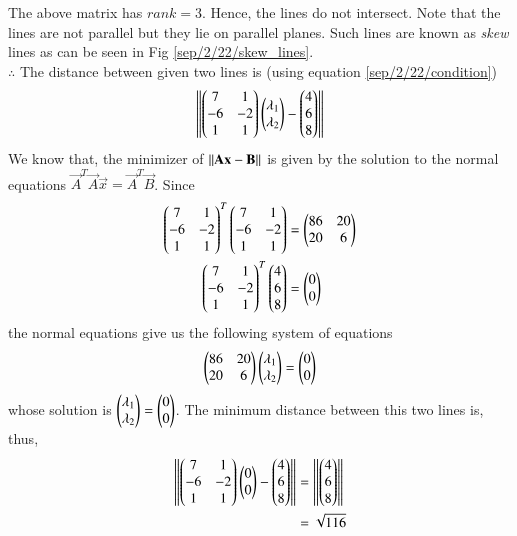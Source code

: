 The above matrix has $rank = 3$.  Hence, the lines do not intersect.  Note that the lines are not parallel but they  lie on parallel planes.  Such lines are known as {\em skew} lines as can be seen in Fig \ref{sep/2/22/skew_lines}.\\
$\therefore$ The distance between given two lines is (using  equation \eqref{sep/2/22/condition})
\begin{align}
\left\lVert\begin{pmatrix}7 & 1 \\ -6 & -2 \\ 1 & 1\end{pmatrix}\begin{pmatrix}\lambda_1\\ \lambda_2\end{pmatrix} - \begin{pmatrix}4\\6\\8\end{pmatrix}\right\rVert
\end{align}
We know that, the minimizer of $\left\lVert\mathbf{A}\mathbf{x} - \mathbf{B}\right\rVert$ is given by the solution to the normal equations $\vec{A}^{T}\vec{A}\vec{x} = \vec{A}^{T}\vec{B}$. Since
\begin{align}
\begin{pmatrix}7 & 1 \\ -6 & -2 \\ 1 & 1\end{pmatrix}^{T}\begin{pmatrix}7 & 1 \\ -6 & -2 \\ 1 & 1\end{pmatrix} &= \begin{pmatrix}86 & 20 \\ 20 & 6\end{pmatrix}\\
\begin{pmatrix}7 & 1 \\ -6 & -2 \\ 1 & 1\end{pmatrix}^{T}\begin{pmatrix}4\\6\\8\end{pmatrix} &= \begin{pmatrix}0 \\ 0\end{pmatrix}
\end{align}
the normal equations give us the following system of equations
\begin{align}
\begin{pmatrix}86 & 20 \\ 20 & 6\end{pmatrix}\begin{pmatrix}\lambda_1\\ \lambda_2\end{pmatrix} = \begin{pmatrix}0 \\ 0\end{pmatrix}
\end{align}
whose solution is $\begin{pmatrix}\lambda_1\\ \lambda_2\end{pmatrix} = \begin{pmatrix}0\\ 0\end{pmatrix}$. The minimum distance between this two lines is, thus,
\begin{align}
\left\lVert\begin{pmatrix}7 & 1 \\ -6 & -2 \\ 1 & 1\end{pmatrix}\begin{pmatrix}0 \\ 0\end{pmatrix} - \begin{pmatrix}4\\6\\8\end{pmatrix}\right\rVert &= \left\lVert\begin{pmatrix}4\\6\\8\end{pmatrix}\right\rVert\\
																		 &= \sqrt{116}
\end{align}
